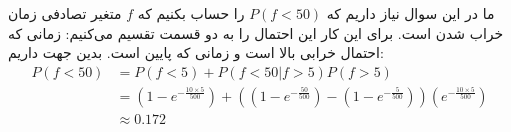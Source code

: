 ما در این سوال نیاز داریم که
$P(f < 50)$
را حساب بکنیم که
$f$
متغیر تصادفی زمان خراب شدن است. برای این کار این احتمال را به دو قسمت تقسیم می‌کنیم:
زمانی که احتمال خرابی بالا است و زمانی که پایین است. بدین جهت داریم:
\begin{align*}
    P(f < 50) &= P(f < 5) + P(f < 50 | f > 5) P(f > 5)\\
    &= (1 - e^{-\frac{10 \times 5}{500}}) + ((1 - e^{-\frac{50}{500}}) - (1 - e^{-\frac{5}{500}})) (e^{-\frac{10 \times 5}{500}})\\
    &\approx 0.172
\end{align*}


